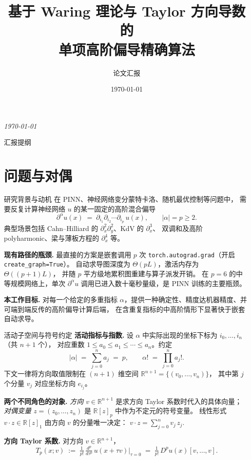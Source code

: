 \documentclass[10pt,aspectratio=169]{beamer}
\title{基于 Waring 理论与 Taylor 方向导数的\\单项高阶偏导精确算法}
\subtitle{论文汇报}
\author{\vspace{-1em}}
\institute{}
\date{\today}
\newcommand{\R}{\mathbb{R}}
\newcommand{\Tp}{T_p}
\newcommand{\dal}{\partial^{\alpha}}
\begin{document}
\begin{frame}[plain]
  \titlepage
  \vspace{-0.5em}
  \begin{center}
    \small\itshape \today
  \end{center}
\end{frame}

\begin{frame}{汇报提纲}
  \small
  \tableofcontents
\end{frame}

\section{问题与对偶}

\begin{frame}{研究背景与动机}
  在 PINN、神经网络变分蒙特卡洛、随机最优控制等问题中，
  需要反复计算神经网络 $u$ 的某一固定的高阶混合偏导
  \[
    \dal u(x) \;=\; \partial_{i_1}\partial_{i_2}\cdots\partial_{i_p}\,u(x),
    \qquad |\alpha|=p\ge 2.
  \]
  典型场景包括 Cahn--Hilliard 的 $\partial_x^2\partial_y^2$、KdV 的 $\partial_x^3$、
  双调和及高阶 polyharmonic、梁与薄板方程的 $\partial_x^4$ 等。

  \medskip
  \textbf{现有路径的瓶颈.}\;
  最直接的方案是嵌套调用 $p$ 次 \texttt{torch.autograd.grad}（开启 \texttt{create\_graph=True}）。
  自动求导图深度为 $\Theta(pL)$，激活内存为 $\Theta((p+1)L)$，
  并随 $p$ 平方级地累积图重建与算子派发开销。
  在 $p=6$ 的中等规模网络上，单次 $\dal u$ 调用已进入数十毫秒量级，是 PINN 训练的主要瓶颈。

  \medskip
  \textbf{本工作目标.}\;
  对每一个给定的多重指标 $\alpha$，提供一种确定性、精度达机器精度、并可端到端反传的高阶偏导计算后端，
  在含重复指标的中高阶情形下显著快于嵌套自动求导。
\end{frame}

\begin{frame}{活动子空间与符号约定}
  \textbf{活动指标与指数.}\;
  设 $\alpha$ 中实际出现的坐标下标为 $i_0,\dots,i_n$（共 $n+1$ 个），
  对应重数 $1\le a_0\le a_1\le\cdots\le a_n$。约定
  \[
    |\alpha| \;=\; \sum_{j=0}^{n} a_j \;=\; p,
    \qquad
    \alpha! \;=\; \prod_{j=0}^{n} a_j!.
  \]
  下文一律将方向取值限制在 $(n+1)$ 维空间 $\R^{n+1}=\{(v_0,\dots,v_n)\}$，
  其中第 $j$ 个分量 $v_j$ 对应坐标方向 $e_{i_j}$。

  \medskip
  \textbf{两个不同角色的对象.}\;
  \emph{方向 $v\in\R^{n+1}$} 是求方向 Taylor 系数时代入的具体向量；
  \emph{对偶变量 $z=(z_0,\dots,z_n)$} 是 $\R[z]_p$ 中作为不定元的符号变量。
  线性形式 $v\!\cdot\!z\in\R[z]_1$ 由方向 $v$ 的分量唯一决定：
  $\displaystyle v\cdot z = \sum_{j=0}^{n} v_j\,z_j$.

  \medskip
  \textbf{方向 Taylor 系数.}\;
  对方向 $v\in\R^{n+1}$，
  \[
    \Tp(x;v) \;:=\; \tfrac{1}{p!}\,\tfrac{d^p}{d\tau^p}\,u(x+\tau v)\big|_{\tau=0}
                \;=\; \tfrac{1}{p!}\,D^p u(x)[v,\dots,v].
  \]
\end{frame}
\end{document}

